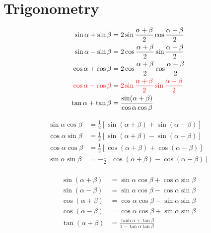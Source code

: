 
\section{Trigonometry}


\begin{multicols}{2}




\begin{equation*}
    \begin{aligned}   
        \sin\alpha + \sin\beta &= 2 \sin\frac{\alpha+\beta}{2}\cos\frac{\alpha-\beta}{2} \\
        \sin\alpha - \sin\beta &= 2 \cos\frac{\alpha+\beta}{2}\sin\frac{\alpha-\beta}{2} \\
        \cos\alpha + \cos\beta &= 2 \cos\frac{\alpha+\beta}{2}\cos\frac{\alpha-\beta}{2} \\
        {\color{red} \cos\alpha - \cos\beta} &={\color{red} 2 \sin\frac{\alpha+\beta}{2}\sin\frac{\alpha-\beta}{2}} \\ 
        \tan\alpha + \tan\beta &= \frac{\sin(\alpha + \beta)}{\cos\alpha\cos\beta}
    \end{aligned}
\end{equation*}

\begin{equation*}
    \begin{aligned}
        \sin\alpha\cos\beta &=\frac{1}{2}[\sin(\alpha+\beta) + \sin(\alpha - \beta)] \\
        \cos\alpha\sin\beta &=\frac{1}{2}[\sin(\alpha+\beta) - \sin(\alpha - \beta)] \\
        \cos\alpha\cos\beta &=\frac{1}{2}[\cos(\alpha + \beta) + \cos(\alpha - \beta)] \\
        \sin\alpha\sin\beta &=-\frac{1}{2}[\cos(\alpha + \beta) - \cos(\alpha - \beta)] \\
    \end{aligned}
\end{equation*}


\begin{equation*}
    \begin{aligned}
        \sin(\alpha + \beta) &=\sin\alpha\cos\beta + \cos\alpha\sin\beta \\
        \sin(\alpha - \beta) &=\sin\alpha\cos\beta - \cos\alpha\sin\beta \\
        \cos(\alpha + \beta) &=\cos\alpha\cos\beta - \sin\alpha\sin\beta \\
        \cos(\alpha - \beta) &=\cos\alpha\cos\beta + \sin\alpha\sin\beta \\
        \tan(\alpha+\beta) &= \frac{\tanh\alpha + \tan\beta}{1 - \tan\alpha \tan\beta} \\   
    \end{aligned}
\end{equation*}


\end{multicols}
